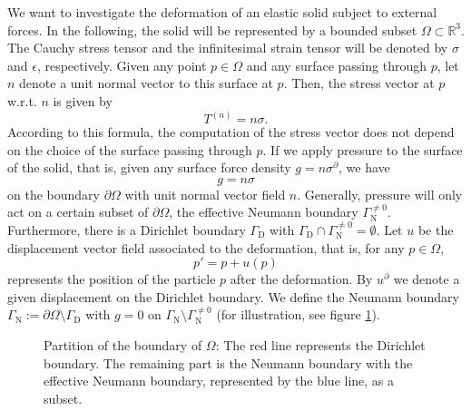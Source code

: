 \documentclass[a4paper, 11pt, twoside]{article}
\theoremstyle{plain}
\theoremstyle{definition}
\begin{document}
We want to investigate the deformation of an elastic solid subject to external forces.
In the following, the solid will be represented by a bounded subset $\Omega \subset \mathbb{R}^3$.
The Cauchy stress tensor and the infinitesimal strain tensor will be denoted by $\sigma$ and $\epsilon$, respectively.
Given any point $p \in \Omega$ and any surface passing through $p$, let $n$ denote a unit normal vector to this surface at $p$.
Then, the stress vector at $p$ w.r.t. $n$ is given by
\begin{equation}
 T^{(n)} = n \sigma.
\end{equation}
According to this formula, the computation of the stress vector does not depend on the choice of the surface passing through $p$.
If we apply pressure to the surface of the solid, that is, given any surface force density $g = n \sigma^\partial$, we have
\begin{equation}
 g = n \sigma
\end{equation}
on the boundary $\partial \Omega$ with unit normal vector field $n$.
Generally, pressure will only act on a certain subset of $\partial\Omega$, the effective Neumann boundary $\Gamma_{\text{N}}^{\neq 0}$.
Furthermore, there is a Dirichlet boundary $\Gamma_{\text{D}}$ with $\Gamma_{\text{D}} \cap \Gamma_{\text{N}}^{\neq 0} = \emptyset$.
Let $u$ be the displacement vector field associated to the deformation, that is, for any $p \in\Omega$,
\begin{equation}
	p' = p + u(p)
\end{equation}
represents the position of the particle $p$ after the deformation.
By $u^\partial$ we denote a given displacement on the Dirichlet boundary.
We define the Neumann boundary $\Gamma_{\text{N}} := \partial\Omega \setminus \Gamma_{\text{D}}$ with $g = 0$ on $\Gamma_{\text{N}} \setminus \Gamma_{\text{N}}^{\neq 0}$ (for illustration, see figure \ref{fig:liver}).

\begin{figure}[htb]
	\centering 
	\def\svgwidth{200pt} 
	
	\caption{Partition of the boundary of $\Omega$: The red line represents the Dirichlet boundary. The remaining part is the Neumann boundary with the effective Neumann boundary, represented by the blue line, as a subset.} 
	\label{fig:liver}
\end{figure}
\end{document}
